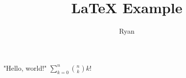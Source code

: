 \documentclass[paper=letter, fontsize=11pt]{article}            %
\title{LaTeX Example}
\author{Ryan}
\begin{document}
\maketitle              %

"Hello, world!" $\sum\limits_{k=0}^n {n \choose k} k!$ 
\end{document}
